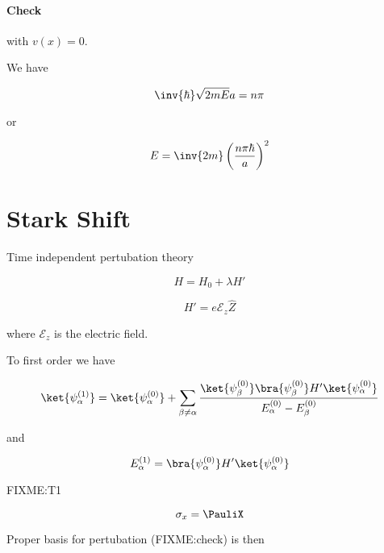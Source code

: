 \paragraph{Check} with $v(x) = 0$.

We have

\begin{equation}\label{eqn:qmTwoR3:210}
\inv{\hbar} \sqrt{2m E} a = n \pi
\end{equation}

or

\begin{equation}\label{eqn:qmTwoR3:230}
E = \inv{2m} \left(\frac{n \pi \hbar}{a}\right)^2
\end{equation}

\section{Stark Shift}

Time independent pertubation theory

\begin{equation}\label{eqn:qmTwoR3:250}
H = H_0 + \lambda H'
\end{equation}

\begin{equation}\label{eqn:qmTwoR3:270}
H' = e \mathcal{E}_z \hat{Z}
\end{equation}

where $\mathcal{E}_z$ is the electric field.

To first order we have

\begin{equation}\label{eqn:qmTwoR3:290}
\ket{\psi_\alpha^{(1)}} = \ket{\psi_\alpha^{(0)}} 
+ 
\sum_{\beta \ne \alpha} \frac{ 
\ket{\psi_\beta^{(0)}} \bra{\psi_\beta^{(0)}} H' \ket{\psi_\alpha^{(0)}} 
}{
E_\alpha^{(0)} 
-E_\beta^{(0)} 
}
\end{equation}

and 

\begin{equation}\label{eqn:qmTwoR3:310}
E_\alpha^{(1)} = 
\bra{\psi_\alpha^{(0)}} H' \ket{\psi_\alpha^{(0)}} 
\end{equation}

FIXME:T1

\begin{equation}\label{eqn:qmTwoR3:330}
\sigma_x = \PauliX
\end{equation}

Proper basis for pertubation (FIXME:check) is then

